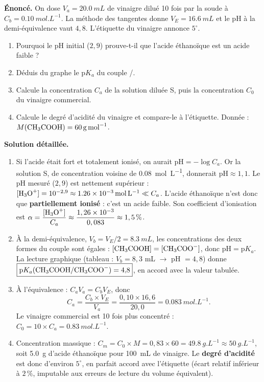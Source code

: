 \documentclass[11pt]{article}
\newcommand{\cle}[1]{{\popxbold\color{popdark}#1}}
\begin{document}
\begin{exoresolu}
\textbf{Énoncé.} On dose $V_a = \SI{20,0}{mL}$ de vinaigre dilué 10 fois par la soude à $C_b = \SI{0,10}{mol.L^{-1}}$. La méthode des tangentes donne $V_E = \SI{16,6}{mL}$ et le pH à la demi-équivalence vaut $4{,}8$. L'étiquette du vinaigre annonce $5^{\circ}$.
\begin{enumerate}
\item Pourquoi le pH initial ($2{,}9$) prouve-t-il que l'acide éthanoïque est un acide faible ?
\item Déduis du graphe le $\mathrm{p}K_a$ du couple /.
\item Calcule la concentration $C_a$ de la solution diluée S, puis la concentration $C_0$ du vinaigre commercial.
\item Calcule le degré d'acidité du vinaigre et compare-le à l'étiquette. Donnée : $M(\ce{CH3COOH}) = \SI{60}{g.mol^{-1}}$.
\end{enumerate}
\tcblower
\textbf{Solution détaillée.}
\begin{enumerate}
\item Si l'acide était fort et totalement ionisé, on aurait $\mathrm{pH} = -\log C_a$. Or la solution S, de concentration voisine de \SI{0,08}{mol.L^{-1}}, donnerait $\mathrm{pH} \approx 1{,}1$. Le pH mesuré ($2{,}9$) est nettement supérieur : $[\ce{H3O+}] = 10^{-2,9} \approx \SI{1,26e-3}{mol.L^{-1}} \ll C_a$. L'acide éthanoïque n'est donc que \textbf{partiellement ionisé} : c'est un \cle{acide faible}. Son coefficient d'ionisation est $\alpha = \dfrac{[\ce{H3O+}]}{C_a} \approx \dfrac{1,26 \times 10^{-3}}{0,083} \approx 1,5\,\%$.
\item À la demi-équivalence, $V_b = V_E/2 = \SI{8,3}{mL}$, les concentrations des deux formes du couple sont égales : $[\ce{CH3COOH}] = [\ce{CH3COO-}]$, donc $\mathrm{pH} = \mathrm{p}K_a$. La lecture graphique (tableau : $V_b = 8,3$ mL $\rightarrow$ pH $= 4,8$) donne $\boxed{\mathrm{p}K_a(\ce{CH3COOH}/\ce{CH3COO-}) = 4{,}8}$, en accord avec la valeur tabulée.
\item À l'équivalence : $C_a V_a = C_b V_E$, donc
\[ C_a = \frac{C_b \times V_E}{V_a} = \frac{0,10 \times 16,6}{20,0} = \SI{0,083}{mol.L^{-1}}. \]
Le vinaigre commercial est 10 fois plus concentré : $C_0 = 10 \times C_a = \SI{0,83}{mol.L^{-1}}$.
\item Concentration massique : $C_m = C_0 \times M = 0,83 \times 60 = \SI{49,8}{g.L^{-1}} \approx \SI{50}{g.L^{-1}}$, soit \SI{5,0}{g} d'acide éthanoïque pour \SI{100}{mL} de vinaigre. Le \textbf{degré d'acidité} est donc d'environ $\boxed{5^{\circ}}$, en parfait accord avec l'étiquette (écart relatif inférieur à $2\,\%$, imputable aux erreurs de lecture du volume équivalent).
\end{enumerate}
\end{exoresolu}
\end{document}
